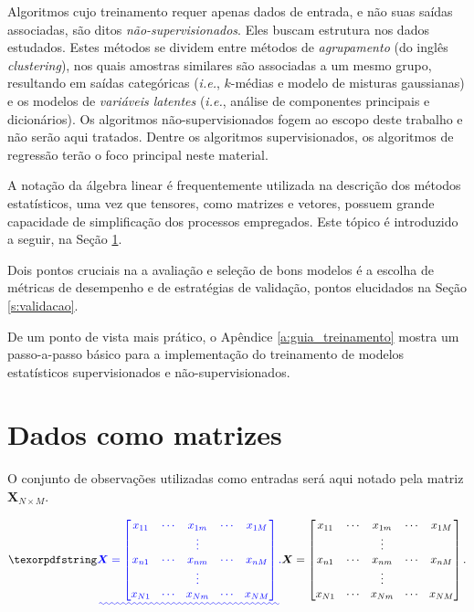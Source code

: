   Algoritmos cujo treinamento requer apenas dados de entrada, e não suas saídas associadas, são ditos \emph{não-supervisionados}. Eles buscam estrutura nos dados estudados. Estes métodos se dividem entre métodos de \emph{agrupamento} (do inglês \textit{clustering}), nos quais amostras similares são associadas a um mesmo grupo, resultando em saídas categóricas (\textit{i.e.}, $k$-médias e modelo de misturas gaussianas) e os modelos de \emph{variáveis latentes} (\textit{i.e.}, análise de componentes principais e dicionários). Os algoritmos não-supervisionados fogem ao escopo deste trabalho e não serão aqui tratados. Dentre os algoritmos supervisionados, os algoritmos de regressão terão o foco principal neste material.

  A notação da álgebra linear é frequentemente utilizada na descrição dos métodos estatísticos, uma vez que tensores, como matrizes e vetores, possuem grande capacidade de simplificação dos processos empregados. Este tópico é introduzido a seguir, na Seção \ref{s:notacao_algebrica}.

  Dois pontos cruciais na a avaliação e seleção de bons modelos é a escolha de métricas de desempenho e de estratégias de validação, pontos elucidados na Seção \ref{s:validacao}.

  De um ponto de vista mais prático, o Apêndice \ref{a:guia_treinamento} mostra um passo-a-passo básico para a implementação do treinamento de modelos estatísticos supervisionados e não-supervisionados.

  \section{Dados como matrizes}  \label{s:notacao_algebrica}

    O conjunto de observações utilizadas como entradas será aqui notado pela matriz $\boldsymbol{X}_{N \times M}$.
\DIFaddbegin 

    \begin{equation} \DIFadd{\label{e:X}
      \boldsymbol{X} = \begin{bmatrix}
        x_{11} & \cdots & x_{1m} & \cdots & x_{1M} \\
               & & \vdots & &       \\
        x_{n1} & \cdots & x_{nm} & \cdots & x_{nM} \\
               & & \vdots & &       \\
        x_{N1} & \cdots & x_{Nm} & \cdots & x_{NM} \\
      \end{bmatrix}
      .
    }\end{equation}

